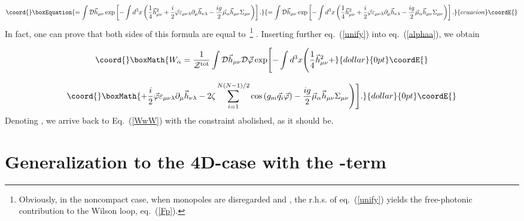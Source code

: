 \documentclass[a4paper,12pt]{article}
\begin{document}
\begin{equation}\coord{}\boxEquation{
\label{unify}
=\int {\cal D}\vec h_{\mu\nu}\exp\left[-\int d^3x\left(
\frac14\vec h_{\mu\nu}^2+\frac{i}{2}\vec\varphi\varepsilon_{\mu\nu\lambda}\partial_\mu
\vec h_{\nu\lambda}-\frac{ig}{2}\vec\mu_\alpha\vec h_{\mu\nu}\Sigma_{\mu\nu}\right)\right].
}{
=\int {\cal D}\vec h_{\mu\nu}\exp\left[-\int d^3x\left(
\frac14\vec h_{\mu\nu}^2+\frac{i}{2}\vec\varphi\varepsilon_{\mu\nu\lambda}\partial_\mu
\vec h_{\nu\lambda}-\frac{ig}{2}\vec\mu_\alpha\vec h_{\mu\nu}\Sigma_{\mu\nu}\right)\right].
}{ecuacion}\coordE{}\end{equation}
In fact, one can prove that both sides of this formula are equal to~\footnote{
Obviously, in the noncompact case, when monopoles are disregarded and \coordHE{}, the r.h.s. of eq.~(\ref{unify}) yields the free-photonic contribution to the Wilson loop,
eq.~(\ref{Fp}).} \coordHE{}.
Inserting further eq.~(\ref{unify}) into eq.~(\ref{alphaa}), we obtain

$$\coord{}\boxMath{W_\alpha=\frac{1}{{\cal Z}^{\rm tot}}
\int{\cal D}\vec h_{\mu\nu}{\cal D}\vec\varphi\exp\Biggl[-\int d^3x\Biggl(
\frac14\vec h_{\mu\nu}^2+}{dollar}{0pt}\coordE{}$$

$$\coord{}\boxMath{
+\frac{i}{2}\vec\varphi\varepsilon_{\mu\nu\lambda}\partial_\mu
\vec h_{\nu\lambda}-2\zeta\sum\limits_{i=1}^{N(N-1)/2}\cos\left(g_m\vec q_i\vec\varphi\right)
-\frac{ig}{2}\vec\mu_\alpha\vec h_{\mu\nu}\Sigma_{\mu\nu}\Biggr)\Biggr].}{dollar}{0pt}\coordE{}$$
Denoting \myHighlight{$\vec\chi\equiv-\vec\varphi$}\coordHE{}, we arrive back to Eq.~(\ref{WwW}) with the constraint \coordHE{} abolished, as it should be.







\section{Generalization to the 4D-case with the \myHighlight{$\theta$}\coordHE{}-term}
\end{document}
